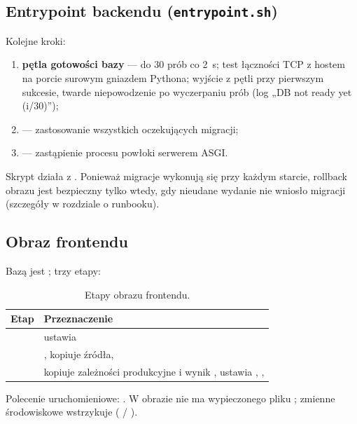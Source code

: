 \subsection{Entrypoint backendu (\texttt{entrypoint.sh})}

Kolejne kroki:

\begin{enumerate}
  \item \textbf{pętla gotowości bazy} --- do 30 prób co 2~s; test łączności TCP z hostem  na porcie  surowym gniazdem Pythona; wyjście z pętli przy pierwszym sukcesie, twarde niepowodzenie po wyczerpaniu prób (log „DB not ready yet (i/30)'');
  \item {} --- zastosowanie wszystkich oczekujących migracji;
  \item {} --- zastąpienie procesu powłoki serwerem ASGI.
\end{enumerate}

Skrypt działa z . Ponieważ migracje wykonują się przy każdym starcie,
rollback obrazu jest bezpieczny tylko wtedy, gdy nieudane wydanie nie wniosło
migracji (szczegóły w rozdziale o runbooku).

\subsection{Obraz frontendu}

Bazą jest ; trzy etapy:

\begin{table}[H]
\centering\small
\begin{tabularx}{\textwidth}{@{}p{}Y@{}}
\toprule
\textbf{Etap} & \textbf{Przeznaczenie} \\
\midrule
{} & ustawia  \\
 & , kopiuje źródła,  \\
 & kopiuje zależności produkcyjne i wynik , ustawia , ,  \\
\bottomrule
\end{tabularx}
\caption{Etapy obrazu frontendu.}
\end{table}

Polecenie uruchomieniowe: . W obrazie nie ma
wypieczonego pliku ; zmienne środowiskowe wstrzykuje 
( / ).

